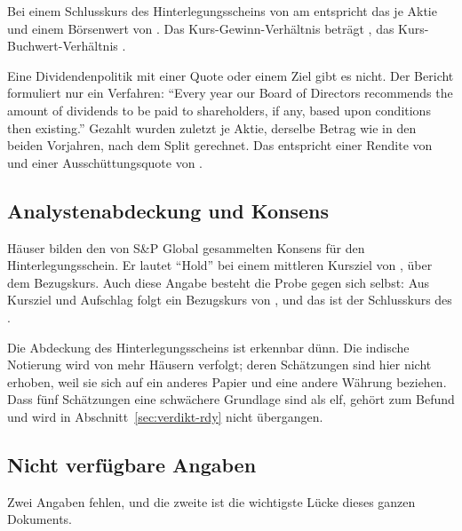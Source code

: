 Bei einem Schlusskurs des Hinterlegungsscheins von \USDje{\RdyKurs} am
\Datum{\RdyKursTag} entspricht das \INRje{\RdyKursRupien} je Aktie und einem
B\"orsenwert von \MrdINR{\RdyMarktwertMrd}. Das Kurs-Gewinn-Verh\"altnis
betr\"agt \Faktor{\RdyKursGewinn}, das Kurs-Buchwert-Verh\"altnis
\Faktor{\RdyKursBuchwert}.

Eine Dividendenpolitik mit einer Quote oder einem Ziel gibt es nicht. Der
Bericht formuliert nur ein Verfahren: \enquote{Every year our Board of
Directors recommends the amount of dividends to be paid to shareholders, if
any, based upon conditions then existing.}
Gezahlt wurden zuletzt \INRje{\RdyDividendeJeAktie} je Aktie, derselbe
Betrag wie in den beiden Vorjahren, nach dem Split
gerechnet.
Das entspricht einer Rendite von \Pct{\RdyDividendenrendite} und einer
Aussch\"uttungsquote von \Pct{\RdyAusschuettungsquote}.

\subsection{Analystenabdeckung und Konsens}

\Stueck{\RdyKonsensHaeuser} H\"auser bilden den von S\&P Global gesammelten
Konsens f\"ur den Hinterlegungsschein. Er lautet \enquote{Hold} bei einem
mittleren Kursziel von \USDje{\RdyKonsensZiel}, \Pct{\RdyKonsensAufschlag}
\"uber dem Bezugskurs.
Auch diese Angabe besteht die Probe gegen sich selbst: Aus Kursziel und
Aufschlag folgt ein Bezugskurs von \USDje{\RdyKonsensBezug}, und das ist der
Schlusskurs des \Datum{\RdyKursTag}.

Die Abdeckung des Hinterlegungsscheins ist erkennbar d\"unn. Die indische
Notierung wird von mehr H\"ausern verfolgt; deren Sch\"atzungen sind hier
nicht erhoben, weil sie sich auf ein anderes Papier und eine andere
W\"ahrung beziehen. Dass f\"unf Sch\"atzungen eine schw\"achere Grundlage
sind als elf, geh\"ort zum Befund und wird in
Abschnitt~\ref{sec:verdikt-rdy} nicht \"ubergangen.

\subsection{Nicht verf\"ugbare Angaben}

Zwei Angaben fehlen, und die zweite ist die wichtigste L\"ucke dieses ganzen
Dokuments.


